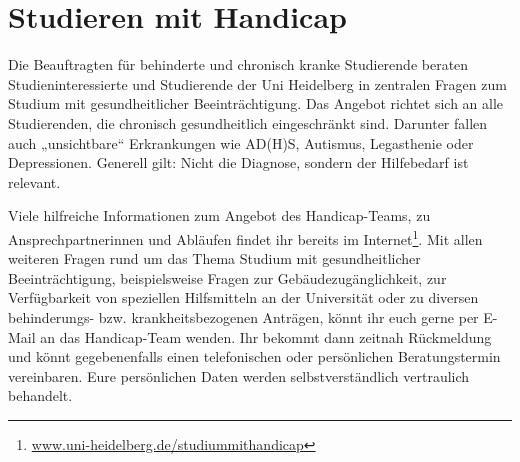 \section{Studieren mit Handicap}
Die Beauftragten für behinderte und chronisch kranke Studierende beraten Studieninteressierte und Studierende der Uni Heidelberg in zentralen Fragen zum Studium mit gesundheitlicher Beeinträchtigung.
Das Angebot richtet sich an alle Studierenden, die chronisch gesundheitlich eingeschränkt sind. Darunter fallen auch „unsichtbare“ Erkrankungen wie AD(H)S, Autismus, Legasthenie oder Depressionen. Generell gilt: Nicht die Diagnose, sondern der Hilfebedarf ist relevant.

Viele hilfreiche Informationen zum Angebot des Handicap-Teams, zu Ansprechpartnerinnen und Abläufen findet ihr bereits im Internet\footnote{\url{www.uni-heidelberg.de/studiummithandicap}}. Mit allen weiteren Fragen rund um das Thema Studium mit gesundheitlicher Beeinträchtigung, beispielsweise Fragen zur Gebäudezugänglichkeit,  zur Verfügbarkeit von speziellen Hilfsmitteln an der Universität oder zu diversen behinderungs- bzw. krankheitsbezogenen Anträgen, könnt ihr euch gerne per E-Mail an das Handicap-Team wenden. Ihr bekommt dann zeitnah Rückmeldung und könnt gegebenenfalls einen telefonischen oder persönlichen Beratungstermin vereinbaren.
Eure persönlichen Daten werden selbstverständlich vertraulich behandelt.
